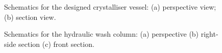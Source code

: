 \begin{figure}[h]
    \centering
    
    \caption{Schematics for the designed crystalliser vessel: (a) perspective view; (b) section view.}
    \label{fig:crystalliser schematic executive}
\end{figure}

\begin{figure}[h]
    \centering
    
    \caption{Schematics for the hydraulic wash column: (a) perspective (b) right-side section (c) front section.}
    \label{fig:wash column schematic executive}
\end{figure}
